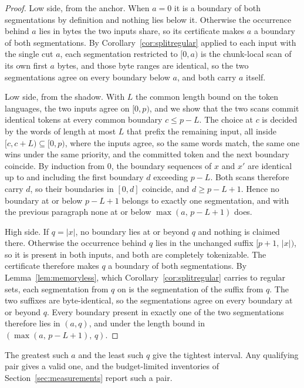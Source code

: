 \documentclass[11pt,a4paper]{article}
\theoremstyle{definition}
\theoremstyle{plain}
\begin{document}
\begin{proof}
Low side, from the anchor. When $a = 0$ it is a boundary of both segmentations by definition and nothing lies below it.
Otherwise the occurrence behind $a$ lies in bytes the two inputs share, so its certificate makes $a$ a boundary of both
segmentations. By Corollary~\ref{cor:splitregular} applied to each input with the single cut $a$, each segmentation
restricted to $[0, a)$ is the chunk-local scan of its own first $a$ bytes, and those byte ranges are identical, so the
two segmentations agree on every boundary below $a$, and both carry $a$ itself.

Low side, from the shadow. With $L$ the common length bound on the token languages, the two inputs agree on $[0, p)$,
and we show that the two scans commit identical tokens at every common boundary $c \le p - L$. The choice at $c$ is
decided by the words of length at most $L$ that prefix the remaining input, all inside $[c, c + L) \subseteq [0, p)$,
where the inputs agree, so the same words match, the same one wins under the same priority, and the committed token and
the next boundary coincide. By induction from $0$, the boundary sequences of $x$ and $x'$ are identical up to and
including the first boundary $d$ exceeding $p - L$. Both scans therefore carry $d$, so their boundaries in $[0, d]$
coincide, and $d \ge p - L + 1$. Hence no boundary at or below $p - L + 1$ belongs to exactly one segmentation, and with
the previous paragraph none at or below $\max(a,\, p - L + 1)$ does.

High side. If $q = |x|$, no boundary lies at or beyond $q$ and nothing is claimed there. Otherwise the occurrence behind
$q$ lies in the unchanged suffix $[p+1,\, |x|)$, so it is present in both inputs, and both are completely tokenizable.
The certificate therefore makes $q$ a boundary of both segmentations. By Lemma~\ref{lem:memoryless}, which
Corollary~\ref{cor:splitregular} carries to regular sets, each segmentation from $q$ on is the segmentation of the
suffix from $q$. The two suffixes are byte-identical, so the segmentations agree on every boundary at or beyond $q$.
Every boundary present in exactly one of the two segmentations therefore lies in $(a, q)$, and under the length bound in
$(\max(a,\, p - L + 1),\, q)$.
\end{proof}

The greatest such $a$ and the least such $q$ give the tightest interval. Any qualifying pair gives a valid one, and the
budget-limited inventories of Section~\ref{sec:measurements} report such a pair.
\end{document}
